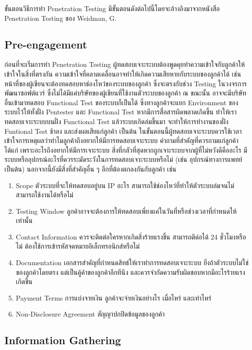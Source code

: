 ขั้นตอนวิธีการทำ Penetration Testing มีขั้นตอนดังต่อไปนี้โดยจะอ้างอิงมาจากหนังสือ Penetration Testing ของ Weidman, G. \cite{weidman2014penetration}

\subsection{Pre-engagement}

ก่อนที่จะเริ่มการทำ Penetration Testing ผู้ทดสอบเจาะระบบต้องพูดคุยทำความเข้าใจกับลูกค้าให้เข้าใจในสิ่งที่ตรงกัน ความเข้าใจที่คลาดเคลื่อนอาจทำให้เกิดความเสียหายกับระบบของลูกค้าได้ เช่น หน้าที่ของผู้เขียนจะต้องทดสอบหาช่องโหว่ของระบบของลูกค้า ซึ่งจะตรงกับช่วง Testing ในวงจรการพัฒนาซอฟต์แวร์ ซึ่งไม่ได้มีแค่บริษัทของผู้เขียนที่ใช้งานตัวระบบของลูกค้า ณ ขณะนั้น อาจจะมีบริษัทอื่นเข้ามาทดสอบ Functional Test ของระบบก็เป็นได้ ซึ่งทางลูกค้าจะแยก Environment ของระบบไว้ให้ทั้งฝั่ง Pentester และ Functional Test หากมีการสื่อสารผิดพลาดเกิดขึ้น ทำให้เราทดสอบเจาะระบบบนฝั่ง Functional Test แล้วระบบเกิดล่มขึ้นมา จะทำให้การทำงานของฝั่ง Funtional Test ช้าลง และส่งผลเสียแก่ลูกค้า เป็นต้น
ในขั้นตอนนี้ผู้ทดสอบเจาะระบบควรใช้เวลาเข้าใจการเหตุผลว่าทำไมลูกค้าถึงอยากให้มีการทดสอบเจาะระบบ คำถามที่สำคัญที่ควรถามแก่ลูกค้าได้แก่ เพราะอะไรถึงอยากให้มีการเจาะระบบ สิ่งที่กลัวที่สุดหากถูกเจาะระบบจากผู้ที่ไม่หวังดีคืออะไร มีระบบหรืออุปกรณ์อะไรที่ควรระมัดระวังในการทดสอบเจาะระบบหรือไม่ (เช่น อุปกรณ์ทางการแพทย์ เป็นต้น)
นอกจากนี้ยังมีสิ่งที่สำคัญอื่น ๆ อีกที่ต้องตกลงกันกับลูกค้า เช่น

\begin{enumerate}
	\item Scope ตัวระบบที่จะให้ทดสอบอยู่บน IP อะไร สามารถใช้ช่องโหว่ที่ทำให้ตัวระบบล่มจนไม่สามารถใช้งานได้หรือไม่ 
	\item Testing Window ลูกค้าอาจจะต้องการให้ทดสอบเพี่ยงแค่ในวันที่หรือช่วงเวลาที่กำหนดให้เท่านั้น
	\item Contact Information ควรจะติดต่อใครหากเกิดสิ่งร้ายแรงขึ้น สามารถติด่อได้ 24 ชั่วโมงหรือไม่ ต้องใช้การเข้ารหัสจดหมายอิเล็กทรอนิกส์หรือไม่
	\item Documentation เอกสารสำคัญที่กำหนดสิทธ์ให้เราทำการทดสอบเจาะระบบ ยิ่งถ้าตัวระบบไม่ใช่ของลูกค้าโดยตรง แต่เป็นคู้ค้าของลูกค้าอีกทีนึง และควรจำกัดความรับผิดชอบหากมีอะไรร้ายแรงเกิดขึ้น
	\item Payment Terms การแบ่งจายเงิน ลูกค้าจะจ่ายเงินอย่างไร เมื่อไหร่ และเท่าไหร่
	\item Non-Disclosure Agreement สัญญาปกปิดข้อมูลของลูกค้า
\end{enumerate}

\subsection{Information Gathering}

